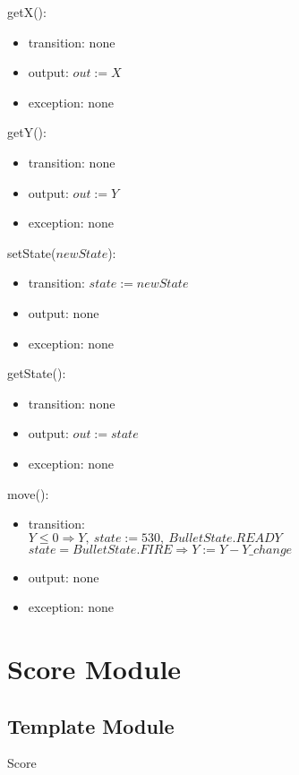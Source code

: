 \documentclass[12pt]{article}
\begin{document}
\noindent getX():
\begin{itemize}
\item transition: none
\item output: $out := X$
\item exception: none
\end{itemize}

\noindent getY():
\begin{itemize}
\item transition: none
\item output: $out := Y$
\item exception: none
\end{itemize}

\noindent setState($\mathit{newState}$):
\begin{itemize}
\item transition: $state := newState$ 
\item output: none
\item exception: none
\end{itemize}

\noindent getState():
\begin{itemize}
\item transition: none
\item output: $out := state$
\item exception: none
\end{itemize}

\noindent move():
\begin{itemize}
\item transition: \\
$Y \leq 0 \Rightarrow Y,\ state := 530,\ BulletState.READY$\\
$state = BulletState.FIRE \Rightarrow Y := Y - Y\_change$
\item output: none
\item exception: none
\end{itemize}
\newpage

\section{Score Module}

\subsection*{Template Module}
Score
\end{document}
